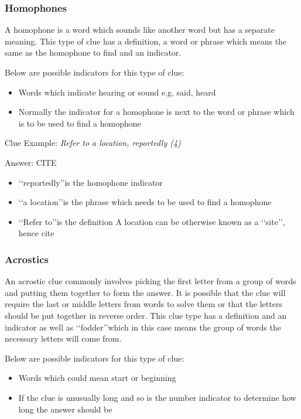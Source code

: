 \subsubsection{Homophones}

A homophone is a word which sounds like another word but has a separate meaning. This type of clue has a definition, a word or phrase which means the same as the homophone to find and an indicator. 

Below are possible indicators for this type of clue:
\begin{itemize} 
	\item Words which indicate hearing or sound e.g. said, heard 
	\item Normally the indicator for a homophone is next to the word or phrase which is to be used to find a homophone  
\\
\end{itemize}

Clue Example: \emph{Refer to a location, reportedly (4)}

Answer: CITE 

\begin{itemize}
	\item \lq\lq reportedly\rq\rq is the homophone indicator 
	\item \lq\lq a location\rq\rq is the phrase which needs to be used to find a homophone 
	\item\lq\lq Refer to\rq\rq is the definition 
	A location can be otherwise known as a \lq\lq site\rq\rq, hence cite 
\end{itemize}

\subsubsection{Acrostics}

An acrostic clue commonly involves picking the first letter from a group of words and putting them together to form the answer. It is possible that the clue will require the last or middle letters from words to solve them or that the letters should be put together in reverse order. This clue type has a definition and an indicator as well as \lq\lq fodder\rq\rq which in this case means the group of words the necessary letters will come from. 

Below are possible indicators for this type of clue:
\begin{itemize}
 	\item Words which could mean start or beginning 
	\item If the clue is unusually long and so is the number indicator to determine how long the answer should be 
\\
\end{itemize}

